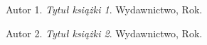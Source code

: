 \begin{thebibliography}{99}
    Autor 1. \textit{Tytuł książki 1}. Wydawnictwo, Rok.

    Autor 2. \textit{Tytuł książki 2}. Wydawnictwo, Rok.
\end{thebibliography}